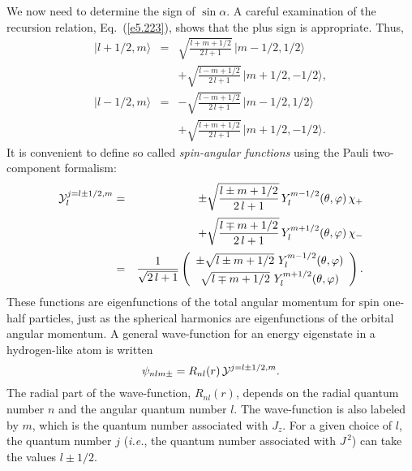 We now need to determine the sign of $\sin\alpha$. A careful examination 
of the recursion relation, Eq.~(\ref{e5.223}), shows that the plus sign is
appropriate. Thus,
\begin{eqnarray}
|l+1/2, m\rangle &=& \sqrt{\frac{l+m+1/2}{2\,l+1}}\,|m-1/2, 1/2\rangle \nonumber
\\[0.5ex]
&&+\sqrt{\frac{l-m+1/2}{2\,l+1}}\,|m+1/2, -1/2\rangle,\label{e6.114}\\[0.5ex]
|l-1/2, m\rangle &=& - \sqrt{\frac{l-m+1/2}{2\,l+1}} \,|m-1/2,1/2\rangle
\nonumber \\[0.5ex]
&&+  \sqrt{\frac{l+m+1/2}{2\,l+1}} \,|m+1/2, -1/2\rangle.\label{e6.115}
\end{eqnarray}
It is convenient to define so called {\em spin-angular functions} using the
Pauli two-component formalism:
\begin{eqnarray}
{\cal Y}_l^{j=l\pm 1/2, m} &=& \pm \sqrt{\frac{l\pm m+1/2}{2\,l+1}}\,
Y_l^{m-1/2}(\theta, \varphi) \,\chi_+\nonumber\\[0.5ex]
&&+\sqrt{\frac{l\mp m+1/2}{2\,l+1}} \,Y_l^{m+1/2}(\theta,\varphi)\, \chi_-
\nonumber\\[0.5ex]
&=& \frac{1}{\sqrt{2\,l+1}}\left( \begin{array}{c}
\pm \sqrt{l\pm m +1/2}\,\,Y_l^{m-1/2}(\theta,\varphi)\\[0.5ex]
\sqrt{l\mp m+1/2}\,\,Y_l^{m+1/2}(\theta, \varphi) \end{array}
\right).
\end{eqnarray}
These functions are eigenfunctions of the total angular momentum for spin
one-half particles, just as the spherical harmonics are  eigenfunctions
of the orbital angular momentum. A general wave-function for an energy
eigenstate in a hydrogen-like atom is written
\begin{equation}\label{e6.117}
\psi_{nlm\pm} = R_{nl}(r)\, {\cal Y}^{j=l\pm 1/2, m}.
\end{equation}
The radial part of the wave-function, $R_{nl}(r)$, depends on the radial
quantum number $n$ and the angular quantum number $l$. The wave-function 
is also
labeled by $m$, which is the quantum number associated with $J_z$. 
For a given choice of $l$, the quantum number $j$
({\em i.e.}, the quantum number associated with $J^{\,2}$) can take the values
 $l\pm 1/2$.  

